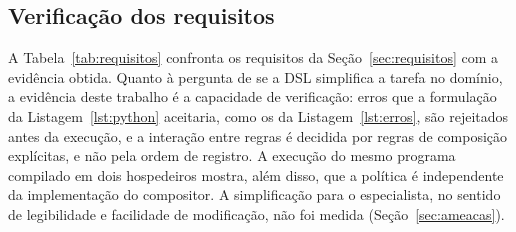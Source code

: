 \documentclass[conference]{IEEEtran}
\begin{document}
\subsection{Verificação dos requisitos}
\label{sec:requisitos-verif}

A Tabela~\ref{tab:requisitos} confronta os requisitos da
Seção~\ref{sec:requisitos} com a evidência obtida. Quanto à pergunta de se a
DSL simplifica a tarefa no domínio, a evidência deste trabalho é a capacidade
de verificação: erros que a formulação da Listagem~\ref{lst:python} aceitaria,
como os da Listagem~\ref{lst:erros}, são rejeitados antes da execução, e a
interação entre regras é decidida por regras de composição explícitas, e não
pela ordem de registro. A execução do mesmo programa compilado em dois
hospedeiros mostra, além disso, que a política é independente da
implementação do compositor. A simplificação para o especialista, no sentido
de legibilidade e facilidade de modificação, não foi medida
(Seção~\ref{sec:ameacas}).
\end{document}
